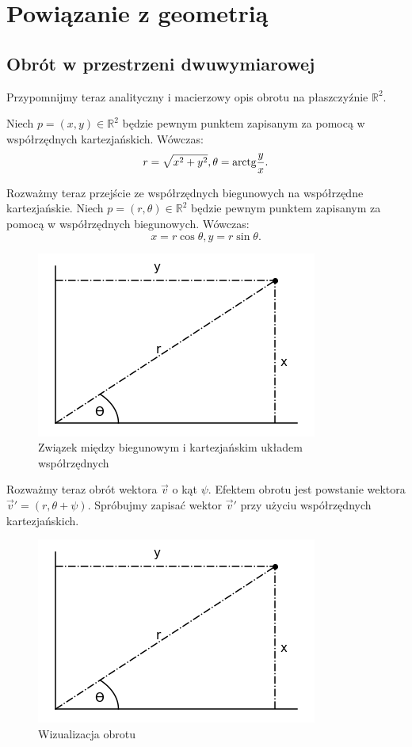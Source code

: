 \documentclass[a4paper,twoside,11pt,reqno]{mwrep}
\theoremstyle{plain} \newtheorem{twr}{Twierdzenie}
\theoremstyle{plain} \newtheorem{lem}{Lemat}
\theoremstyle{definition} \newtheorem{defi}{Definicja}
\theoremstyle{remark} \newtheorem*{wni}{Wniosek}
\theoremstyle{definition} \newtheorem{uwaga}{Uwaga}
\theoremstyle{definition}\newtheorem{prz}{Przykład}
\begin{document}
\chapter{Powiązanie z geometrią}


\section{Obrót w przestrzeni dwuwymiarowej}\label{obrot2drozdzial}
Przypomnijmy teraz analityczny i macierzowy opis obrotu na płaszczyźnie 
$\mathbb{R}^2$. 

Niech $p=(x,y)\in\mathbb{R}^2$ będzie pewnym punktem zapisanym za pomocą w 
współrzędnych kartezjańskich. Wówczas:
$$r = \sqrt{x^2+y^2},\theta=\textup{arctg}\frac{y}{x}.$$

Rozważmy teraz przejście ze współrzędnych biegunowych na
współrzędne kartezjańskie.
Niech $p=(r,\theta)\in\mathbb{R}^2$ będzie pewnym punktem zapisanym za pomocą w 
współrzędnych biegunowych. Wówczas:
$$x=r\cos\theta,y=r\sin\theta.$$ 

\begin{figure}[h]
\begin{center}
\includegraphics[width=6 cm]{wsp_biegunowe.png}
\caption{Związek między biegunowym i kartezjańskim układem współrzędnych}
\end{center}
\end{figure}



Rozważmy teraz obrót wektora $\overrightarrow{v}$ o kąt $\psi$. Efektem obrotu jest powstanie wektora
$\overrightarrow{v}'=(r,\theta+\psi)$. Spróbujmy zapisać wektor $\overrightarrow{v}'$
przy użyciu współrzędnych kartezjańskich.

\begin{figure}[h]
\begin{center}
\includegraphics[width=6 cm]{wsp_biegunowe.png}
\caption{Wizualizacja obrotu}
\end{center}
\end{figure}
\end{document}
